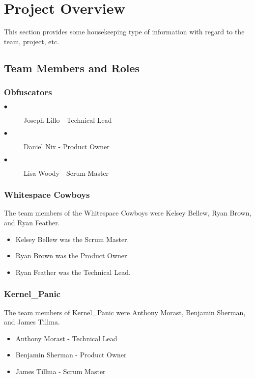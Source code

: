 

\chapter{Project Overview}
This section provides some housekeeping type of information with regard to the 
team, project, etc. 



\section{Team Members and Roles}
\subsection{Obfuscators}
\begin{description}
\item[$\bullet$ ] Joseph Lillo - Technical Lead
\item[$\bullet$ ] Daniel Nix - Product Owner
\item[$\bullet$ ] Lisa Woody - Scrum Master
\end{description}
\subsection{Whitespace Cowboys}
The team members of the Whitespace Cowboys were Kelsey Bellew, Ryan Brown, and Ryan Feather. 

\begin{itemize}
\item Kelsey Bellew was the Scrum Master.
\item Ryan Brown was the Product Owner.
\item Ryan Feather was the Technical Lead.
\end{itemize}

\subsection{Kernel\_Panic}
The team members of Kernel\_Panic were Anthony Morast, Benjamin Sherman, and James Tillma.

\begin{itemize}
\item Anthony Morast - Technical Lead
\item Benjamin Sherman - Product Owner
\item James Tillma - Scrum Master
\end{itemize}


